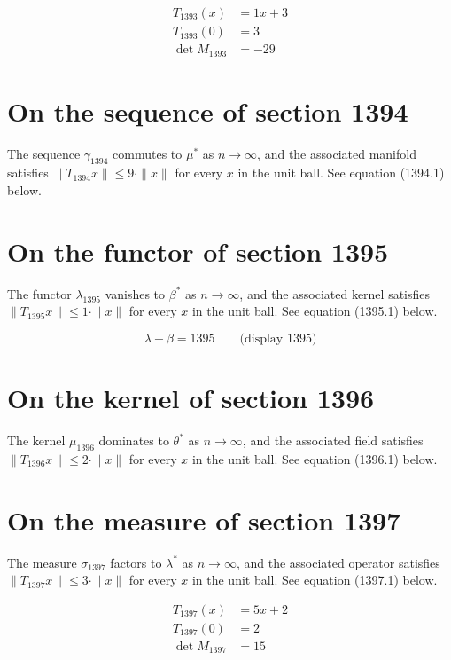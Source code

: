 \documentclass{article}
\begin{document}
\begin{align}
T_{1393}(x) &= 1 x + 3 \\
T_{1393}(0) &= 3 \\
\det M_{1393} &= -29
\end{align}

\section{On the sequence of section 1394}
The sequence $\gamma_{1394}$ commutes to $\mu^{*}$ as $n \to \infty$,
and the associated manifold satisfies $\|T_{1394} x\| \leq 9 \cdot \|x\|$
for every $x$ in the unit ball. See equation (1394.1) below.

\section{On the functor of section 1395}
The functor $\lambda_{1395}$ vanishes to $\beta^{*}$ as $n \to \infty$,
and the associated kernel satisfies $\|T_{1395} x\| \leq 1 \cdot \|x\|$
for every $x$ in the unit ball. See equation (1395.1) below.

$$
\lambda + \beta = 1395 \qquad \text{(display 1395)}
$$

\section{On the kernel of section 1396}
The kernel $\mu_{1396}$ dominates to $\theta^{*}$ as $n \to \infty$,
and the associated field satisfies $\|T_{1396} x\| \leq 2 \cdot \|x\|$
for every $x$ in the unit ball. See equation (1396.1) below.

\section{On the measure of section 1397}
The measure $\sigma_{1397}$ factors to $\lambda^{*}$ as $n \to \infty$,
and the associated operator satisfies $\|T_{1397} x\| \leq 3 \cdot \|x\|$
for every $x$ in the unit ball. See equation (1397.1) below.

\begin{align}
T_{1397}(x) &= 5 x + 2 \\
T_{1397}(0) &= 2 \\
\det M_{1397} &= 15
\end{align}
\end{document}
